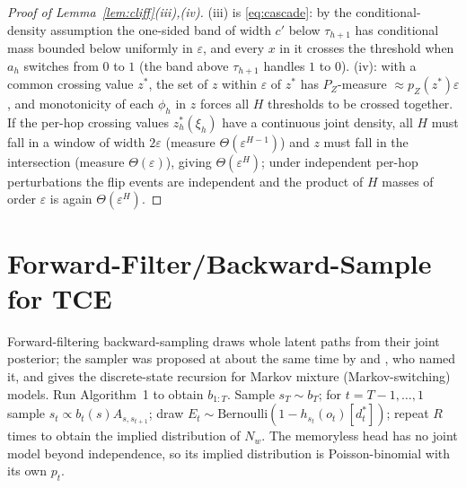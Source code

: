 \documentclass[11pt,a4paper]{article}
\numberwithin{equation}{section}
\theoremstyle{plain}
\theoremstyle{definition}
\theoremstyle{remark}
\begin{document}
\begin{proof}[Proof of Lemma~\ref{lem:cliff}(iii),(iv)]
(iii) is \eqref{eq:cascade}: by the conditional-density assumption the one-sided band of width $c'$ below $\tau_{h+1}$ has conditional mass bounded below uniformly in $\varepsilon$, and every $x$ in it crosses the threshold when $a_h$ switches from $0$ to $1$ (the band above $\tau_{h+1}$ handles $1$ to $0$). (iv): with a common crossing value $z^\ast$, the set of $z$ within $\varepsilon$ of $z^\ast$ has $P_Z$-measure $\approx p_Z(z^\ast)\varepsilon$, and monotonicity of each $\phi_h$ in $z$ forces all $H$ thresholds to be crossed together. If the per-hop crossing values $z_h^\ast(\xi_h)$ have a continuous joint density, all $H$ must fall in a window of width $2\varepsilon$ (measure $\Theta(\varepsilon^{H-1})$) and $z$ must fall in the intersection (measure $\Theta(\varepsilon)$), giving $\Theta(\varepsilon^H)$; under independent per-hop perturbations the flip events are independent and the product of $H$ masses of order $\varepsilon$ is again $\Theta(\varepsilon^H)$.
\end{proof}

\section{Forward-Filter/Backward-Sample for TCE}\label{app:ffbs}
Forward-filtering backward-sampling draws whole latent paths from their joint posterior; the sampler was proposed at about the same time by \citet{carter1994} and \citet{fruhwirth1994}, who named it, and \citet{chib1996} gives the discrete-state recursion for Markov mixture (Markov-switching) models.
Run Algorithm~1 to obtain $b_{1:T}$. Sample $s_T\sim b_T$; for $t=T-1,\dots,1$ sample $s_t\propto b_t(s)A_{s,s_{t+1}}$; draw $E_t\sim\mathrm{Bernoulli}(1-h_{s_t}(o_t)[d^\ast_t])$; repeat $R$ times to obtain the implied distribution of $N_w$. The memoryless head has no joint model beyond independence, so its implied distribution is Poisson-binomial with its own $p_t$.
\end{document}
